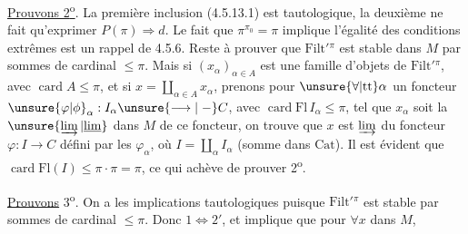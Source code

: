 \uline{Prouvons 2\textsuperscript{o}}. La première  inclusion (4.5.13.1) est tautologique, la deuxième ne fait qu'exprimer $P(\pi)\Rightarrow d$. Le fait que $\pi^{\pi_0}=\pi$ implique l'égalité des conditions extrêmes est un rappel de 4.5.6. Reste à prouver que $\mathrm{Filt}'{}^\pi$ est stable dans $M$ par sommes de cardinal $\leq\pi$. Mais
si $(x_\alpha)_{\alpha\in A}$ est une famille d'objets de $\mathrm{Filt}'{}^\pi$, avec $\operatorname{card}A\leq\pi$, et si $x=\coprod_{\alpha\in A}x_\alpha$, prenons pour $\unsure{\forall|\mathrm{tt}}\alpha$ un foncteur $\unsure{\varphi|\phi}_\alpha:I_\alpha\unsure{\longrightarrow|\mathrel{-}}C$, avec $\operatorname{card}\mathrm{Fl}\,I_\alpha\leq\pi$, tel que $x_\alpha$ soit la $\unsure{\varinjlim|\underline{\lim}}$ dans $M$ de ce foncteur, on trouve que $x$ est $\varinjlim$ du foncteur $\varphi:I\longrightarrow C$ défini par les $\varphi_\alpha$, où $I=\coprod_\alpha I_\alpha$ (somme dans $\mathrm{Cat}$). Il est évident que $\operatorname{card}\mathrm{Fl}(I)\leq\pi\cdot\pi=\pi$, ce qui achève de prouver 2\textsuperscript{o}.

\uline{Prouvons} 3\textsuperscript{o}. On a les implications tautologiques
 puisque $\mathrm{Filt}'{}^\pi$ est stable par sommes de cardinal $\leq\pi$. Donc $1\Leftrightarrow2'$, et implique que pour $\forall x$ dans $M$,
